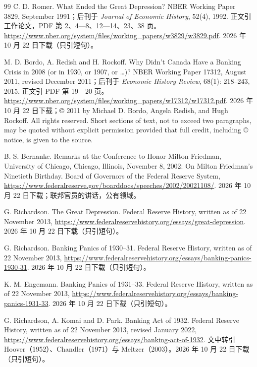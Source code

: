 \begin{thebibliography}{99}
 C. D. Romer. What Ended the Great Depression? NBER Working Paper 3829, September 1991；后刊于 \emph{Journal of Economic History}, 52(4), 1992. 正文引工作论文，PDF 第 2、4—8、12—14、23、38 页。\url{https://www.nber.org/system/files/working_papers/w3829/w3829.pdf}. 2026 年 10 月 22 日下载（只引短句）。

 M. D. Bordo, A. Redish and H. Rockoff. Why Didn't Canada Have a Banking Crisis in 2008 (or in 1930, or 1907, or \ldots)? NBER Working Paper 17312, August 2011, revised December 2011；后刊于 \emph{Economic History Review}, 68(1): 218--243, 2015. 正文引 PDF 第 19—20 页。\url{https://www.nber.org/system/files/working_papers/w17312/w17312.pdf}. 2026 年 10 月 22 日下载；© 2011 by Michael D. Bordo, Angela Redish, and Hugh Rockoff. All rights reserved. Short sections of text, not to exceed two paragraphs, may be quoted without explicit permission provided that full credit, including © notice, is given to the source.

 B. S. Bernanke. Remarks at the Conference to Honor Milton Friedman, University of Chicago, Chicago, Illinois, November 8, 2002: On Milton Friedman's Ninetieth Birthday. Board of Governors of the Federal Reserve System, \url{https://www.federalreserve.gov/boarddocs/speeches/2002/20021108/}. 2026 年 10 月 22 日下载；联邦官员的讲话，公有领域。

 G. Richardson. The Great Depression. Federal Reserve History, written as of 22 November 2013, \url{https://www.federalreservehistory.org/essays/great-depression}. 2026 年 10 月 22 日下载（只引短句）。

 G. Richardson. Banking Panics of 1930--31. Federal Reserve History, written as of 22 November 2013, \url{https://www.federalreservehistory.org/essays/banking-panics-1930-31}. 2026 年 10 月 22 日下载（只引短句）。

 K. M. Engemann. Banking Panics of 1931--33. Federal Reserve History, written as of 22 November 2013, \url{https://www.federalreservehistory.org/essays/banking-panics-1931-33}. 2026 年 10 月 22 日下载（只引短句）。

 G. Richardson, A. Komai and D. Park. Banking Act of 1932. Federal Reserve History, written as of 22 November 2013, revised January 2022, \url{https://www.federalreservehistory.org/essays/banking-act-of-1932}. 文中转引 Hoover（1952）、Chandler（1971）与 Meltzer（2003）。2026 年 10 月 22 日下载（只引短句）。


\end{thebibliography}
